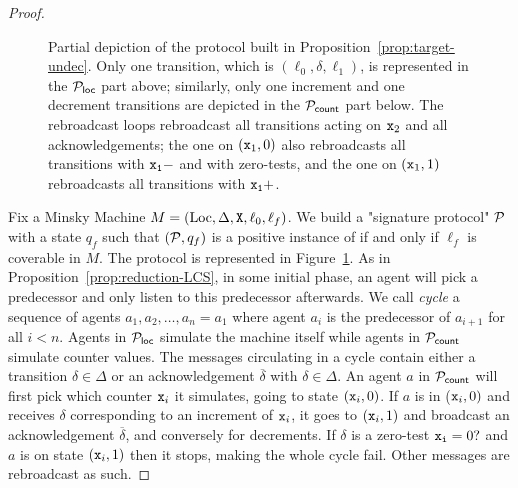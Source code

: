 \begin{proof}
	
	\begin{figure}
			\centering
			\resizebox{.99\linewidth}{!}{
			
			}
			\caption{Partial depiction of the protocol built in Proposition~\ref{prop:target-undec}. Only one transition, which is $(\ell_0, \delta, \ell_1)$, is represented in the $\mathcal{P}_{\mathsf{loc}}$ part above; similarly, only one increment and one decrement transitions are depicted in the $\mathcal{P}_{\mathsf{count}}$ part below. The rebroadcast loops rebroadcast all transitions acting on $\mathtt{x}_2$ and all acknowledgements; the one on $(\mathtt{x}_1,0)$ also rebroadcasts all transitions with $\mathtt{\mathtt{x}_1}-$ and with zero-tests, and the one on $(\mathtt{x}_1,1)$ rebroadcasts all transitions with $\mathtt{\mathtt{x}_1}+$.}
			\label{fig:target-init}
	\end{figure}
	
	Fix a Minsky Machine $M= (\text{Loc}, \Delta, \mathtt{X}, \ell_0, \ell_f)$. We build a "signature protocol" $\mathcal{P}$ with a state $q_f$ such that $(\mathcal{P}, q_f)$ is a positive instance of \TARGET if and only if $\ell_f$ is coverable in $M$. 
	The protocol is represented in Figure~\ref{fig:target-init}. 
	As in Proposition~\ref{prop:reduction-LCS}, in some initial phase, an agent will pick a predecessor and only listen to this predecessor afterwards. We call \emph{cycle} a sequence of agents $a_1, a_2, \ldots, a_n = a_1$ where agent $a_i$ is the predecessor of $a_{i+1}$ for all $i <n$.
	Agents in $\mathcal{P}_{\mathsf{loc}}$ simulate the machine itself while agents in $\mathcal{P}_{\mathsf{count}}$ simulate counter values. The messages circulating in a cycle contain either a transition $\delta \in \Delta$ or an acknowledgement $\overline{\delta}$ with $\delta \in \Delta$. 
	An agent $a$ in $\mathcal{P}_{\mathsf{count}}$ will first pick which counter $\mathtt{x}_i$ it simulates, going to state $(\mathtt{x}_i,0)$. If $a$ is in ($\mathtt{x}_i,0)$ and receives $\delta$ corresponding to an increment of $\mathtt{x}_i$, it goes to $(\mathtt{x}_i,1)$ and broadcast an acknowledgement $\overline{\delta}$, and conversely for decrements. If $\delta$ is a zero-test $\mathtt{\mathtt{x}_i}=0?$ and $a$ is on state $(\mathtt{x}_i,1)$ then it stops, making the whole cycle fail. Other messages are rebroadcast as such. 


\end{proof}

